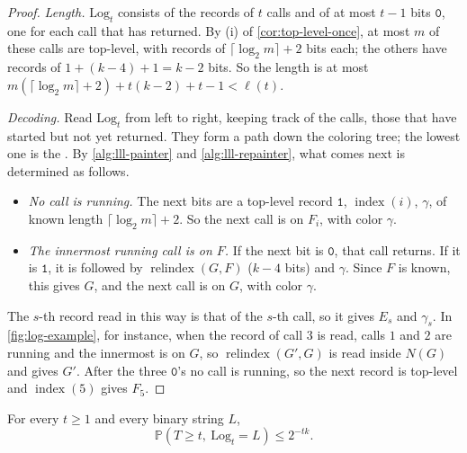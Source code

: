 \begin{proof}
    \emph{Length.} \(\mathrm{Log}_{t}\) consists of the records of \(t\) calls and of at most \(t - 1\) bits \(\texttt{0}\), one for each call that has returned. By (i) of \autoref{cor:top-level-once}, at most \(m\) of these calls are top-level, with records of \(\lceil \log_{2} m \rceil + 2\) bits each; the others have records of \(1 + (k - 4) + 1 = k - 2\) bits. So the length is at most \(m (\lceil \log_{2} m \rceil + 2) + t(k-2) + t - 1 < \ell(t)\).

    \emph{Decoding.} Read \(\mathrm{Log}_{t}\) from left to right, keeping track of the  calls, those that have started but not yet returned. They form a path down the coloring tree; the lowest one is the . By \autoref{alg:lll-painter} and \autoref{alg:lll-repainter}, what comes next is determined as follows.
    \begin{itemize}
        \item \emph{No call is running.} The next bits are a top-level record \(\texttt{1}\), \(\operatorname{index}(i)\), \(\gamma\), of known length \(\lceil \log_{2} m \rceil + 2\). So the next call is on \(F_{i}\), with color \(\gamma\).
        \item \emph{The innermost running call is on \(F\).} If the next bit is \(\texttt{0}\), that call returns. If it is \(\texttt{1}\), it is followed by \(\operatorname{relindex}(G, F)\) (\(k - 4\) bits) and \(\gamma\). Since \(F\) is known, this gives \(G\), and the next call is on \(G\), with color \(\gamma\).
    \end{itemize}
    The \(s\)-th record read in this way is that of the \(s\)-th call, so it gives \(E_{s}\) and \(\gamma_{s}\). In \autoref{fig:log-example}, for instance, when the record of call \(3\) is read, calls \(1\) and \(2\) are running and the innermost is on \(G\), so \(\operatorname{relindex}(G', G)\) is read inside \(N(G)\) and gives \(G'\). After the three \(\texttt{0}\)'s no call is running, so the next record is top-level and \(\operatorname{index}(5)\) gives \(F_{5}\).
\end{proof}

\begin{lemma}\label{lem:log-probability}
    For every \(t \ge 1\) and every binary string \(L\),
    \[
        \mathbb{P}(T \ge t, \ \mathrm{Log}_{t} = L) \le 2^{-tk} .
    \]
\end{lemma}

